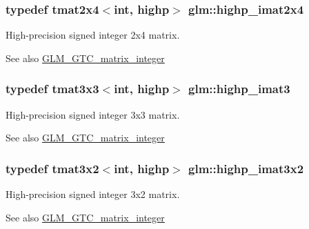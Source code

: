 \subsubsection[{highp\+\_\+imat2x4}]{\setlength{\rightskip}{0pt plus 5cm}typedef tmat2x4$<$int, highp$>$ {\bf glm\+::highp\+\_\+imat2x4}}\label{group__gtc__matrix__integer_gae7502957eb2ab9268726d87389ae2b55}
High-\/precision signed integer 2x4 matrix. \begin{DoxySeeAlso}{See also}
\hyperlink{group__gtc__matrix__integer}{G\+L\+M\+\_\+\+G\+T\+C\+\_\+matrix\+\_\+integer} 
\end{DoxySeeAlso}
\hypertarget{group__gtc__matrix__integer_ga0766d11d0154f42893ef0912ab7c6a2c}{}
\subsubsection[{highp\+\_\+imat3}]{\setlength{\rightskip}{0pt plus 5cm}typedef tmat3x3$<$int, highp$>$ {\bf glm\+::highp\+\_\+imat3}}\label{group__gtc__matrix__integer_ga0766d11d0154f42893ef0912ab7c6a2c}
High-\/precision signed integer 3x3 matrix. \begin{DoxySeeAlso}{See also}
\hyperlink{group__gtc__matrix__integer}{G\+L\+M\+\_\+\+G\+T\+C\+\_\+matrix\+\_\+integer} 
\end{DoxySeeAlso}
\hypertarget{group__gtc__matrix__integer_ga2c8dc817124f44bc01f27777bfce983b}{}
\subsubsection[{highp\+\_\+imat3x2}]{\setlength{\rightskip}{0pt plus 5cm}typedef tmat3x2$<$int, highp$>$ {\bf glm\+::highp\+\_\+imat3x2}}\label{group__gtc__matrix__integer_ga2c8dc817124f44bc01f27777bfce983b}
High-\/precision signed integer 3x2 matrix. \begin{DoxySeeAlso}{See also}
\hyperlink{group__gtc__matrix__integer}{G\+L\+M\+\_\+\+G\+T\+C\+\_\+matrix\+\_\+integer} 
\end{DoxySeeAlso}
\hypertarget{group__gtc__matrix__integer_gaecb62c11fb25aadbb7eecc2da226d444}{}

